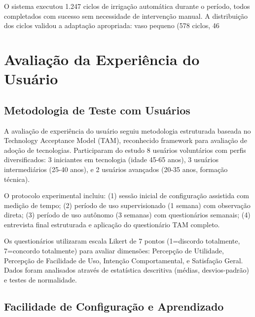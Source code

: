 O sistema executou 1.247 ciclos de irrigação automática durante o período, todos completados com sucesso sem necessidade de intervenção manual. A distribuição dos ciclos validou a adaptação apropriada: vaso pequeno (578 ciclos, 46%


\section{Avaliação da Experiência do Usuário}

\subsection{Metodologia de Teste com Usuários}

A avaliação de experiência do usuário seguiu metodologia estruturada baseada no Technology Acceptance Model (TAM), reconhecido framework para avaliação de adoção de tecnologias. Participaram do estudo 8 usuários voluntários com perfis diversificados: 3 iniciantes em tecnologia (idade 45-65 anos), 3 usuários intermediários (25-40 anos), e 2 usuários avançados (20-35 anos, formação técnica).

O protocolo experimental incluiu: (1) sessão inicial de configuração assistida com medição de tempo; (2) período de uso supervisionado (1 semana) com observação direta; (3) período de uso autônomo (3 semanas) com questionários semanais; (4) entrevista final estruturada e aplicação do questionário TAM completo.

Os questionários utilizaram escala Likert de 7 pontos (1=discordo totalmente, 7=concordo totalmente) para avaliar dimensões: Percepção de Utilidade, Percepção de Facilidade de Uso, Intenção Comportamental, e Satisfação Geral. Dados foram analisados através de estatística descritiva (médias, desvios-padrão) e testes de normalidade.

\subsection{Facilidade de Configuração e Aprendizado}

